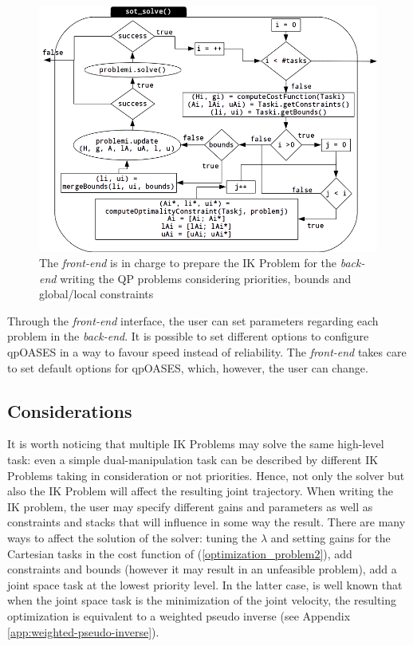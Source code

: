 \begin{figure}[htb] 
\centering 
\includegraphics[width=\textwidth]{gfx/QPOases_sot_solve2.png} 
\caption{The \emph{front-end} is in charge to prepare the IK Problem for the \emph{back-end} writing the QP problems considering priorities, bounds and global/local constraints} 
\label{qpOasesSoT}
\end{figure}

Through the \emph{front-end} interface, the user can set parameters regarding each problem in the \emph{back-end}. It is possible to set different options to configure qpOASES in a way to favour speed instead of reliability. The \emph{front-end} takes care to set default options for qpOASES, which, however, the user can change. 

\subsection{Considerations}
It is worth noticing that multiple IK Problems may solve the same high-level task: even a simple dual-manipulation task can be described by different IK Problems taking in consideration or not priorities. Hence, not only the solver but also the IK Problem will affect the resulting joint trajectory. When writing the IK problem, the user may specify different gains and parameters as well as constraints and stacks that will influence in some way the result. There are many ways to affect the solution of the solver: tuning the $\lambda$ and setting gains for the Cartesian tasks in the cost function of (\ref{optimization_problem2}), add constraints and bounds (however it may result in an unfeasible problem), add a joint space task at the lowest priority level. In the latter case, is well known that when the joint space task is the minimization of the joint velocity, the resulting optimization is equivalent to a weighted pseudo inverse \cite{Siciliano:2008} (see Appendix \ref{app:weighted-pseudo-inverse}).


